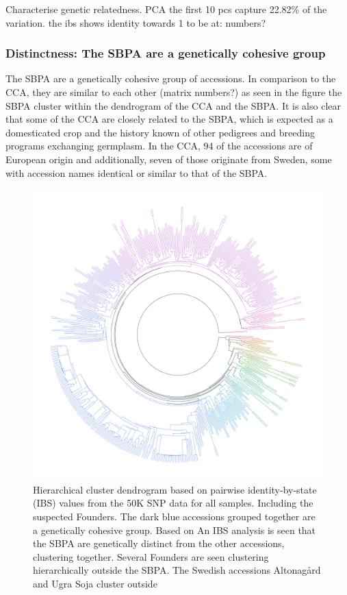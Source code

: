 \documentclass[9pt, onecolumn,twoside]{gsajnl}
\begin{document}
Characterise genetic relatedness. 
PCA the first 10 pcs capture 22.82\%  of the variation.
the ibs shows identity towards 1 to be at: numbers?

\subsubsection{Distinctness: The SBPA are a genetically cohesive group}
The SBPA are a genetically cohesive group of accessions. In comparison to the CCA, they are similar to each other (matrix numbers?) as seen in the figure the SBPA cluster within the dendrogram of the CCA and the SBPA.  It is also clear that some of the CCA are closely related to the SBPA, which is expected as a domesticated crop and the history known of other pedigrees and breeding programs exchanging germplasm. In the CCA, 94 of the accessions are of European origin and additionally, seven of those  originate from Sweden, some with accession names identical or similar to that of the SBPA. 
\begin{figure}
\centering
\includegraphics[width=\linewidth]{rainbow.pdf}

\caption{Hierarchical cluster dendrogram based on pairwise identity-by-state (IBS) values from the 50K SNP data for all samples. Including the suspected Founders. The dark blue accessions grouped together are a genetically cohesive group. Based on An IBS analysis is seen that the SBPA are genetically distinct from the other accessions, clustering together. Several Founders are seen clustering hierarchically outside the SBPA. The Swedish accessions Altonagård and Ugra Soja cluster outside }%
\label{fig:dendo}
\end{figure}
\end{document}
